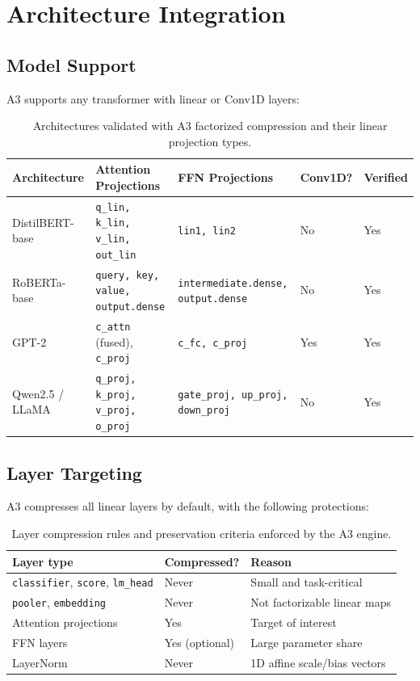 
\section{Architecture Integration}

\subsection{Model Support}

A3 supports any transformer with linear or Conv1D layers:

\begin{table}[H]
\centering
\small
\begin{tabular}{lllll}
\toprule
\textbf{Architecture} & \textbf{Attention Projections} & \textbf{FFN Projections} & \textbf{Conv1D?} & \textbf{Verified} \\
\midrule
DistilBERT-base & \texttt{q\_lin, k\_lin, v\_lin, out\_lin} & \texttt{lin1, lin2} & No & Yes \\
RoBERTa-base & \texttt{query, key, value, output.dense} & \texttt{intermediate.dense, output.dense} & No & Yes \\
GPT-2 & \texttt{c\_attn} (fused), \texttt{c\_proj} & \texttt{c\_fc, c\_proj} & Yes & Yes \\
Qwen2.5 / LLaMA & \texttt{q\_proj, k\_proj, v\_proj, o\_proj} & \texttt{gate\_proj, up\_proj, down\_proj} & No & Yes \\
\bottomrule
\end{tabular}
\caption{Architectures validated with A3 factorized compression and their linear projection types.}
\label{tab:architecture_support}
\end{table}

\subsection{Layer Targeting}

A3 compresses all linear layers by default, with the following protections:

\begin{table}[H]
\centering
\small
\begin{tabular}{lll}
\toprule
\textbf{Layer type} & \textbf{Compressed?} & \textbf{Reason} \\
\midrule
\texttt{classifier}, \texttt{score}, \texttt{lm\_head} & Never & Small and task-critical \\
\texttt{pooler}, \texttt{embedding} & Never & Not factorizable linear maps \\
Attention projections & Yes & Target of interest \\
FFN layers & Yes (optional) & Large parameter share \\
LayerNorm & Never & 1D affine scale/bias vectors \\
\bottomrule
\end{tabular}
\caption{Layer compression rules and preservation criteria enforced by the A3 engine.}
\label{tab:layer_rules}
\end{table}

